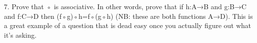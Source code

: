 

7. Prove that ◦ is associative. 
In other words, prove that if h:A→B and g:B→C and f:C→D then (f◦g)◦h=f◦(g◦h) (NB: these are both functions A→D).
This is a great example of a question that is dead easy once you actually figure out what it’s asking.
